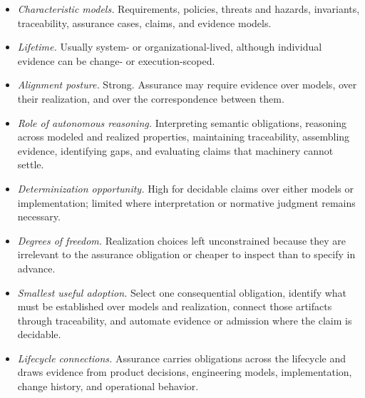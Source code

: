 \begin{itemize}
\tightlist
\item
  \emph{Characteristic models.} Requirements, policies, threats and hazards, invariants, traceability, assurance cases, claims, and evidence models.
\item
  \emph{Lifetime.} Usually system- or organizational-lived, although individual evidence can be change- or execution-scoped.
\item
  \emph{Alignment posture.} Strong. Assurance may require evidence over models, over their realization, and over the correspondence between them.
\item
  \emph{Role of autonomous reasoning.} Interpreting semantic obligations, reasoning across modeled and realized properties, maintaining traceability, assembling evidence, identifying gaps, and evaluating claims that machinery cannot settle.
\item
  \emph{Determinization opportunity.} High for decidable claims over either models or implementation; limited where interpretation or normative judgment remains necessary.
\item
  \emph{Degrees of freedom.} Realization choices left unconstrained because they are irrelevant to the assurance obligation or cheaper to inspect than to specify in advance.
\item
  \emph{Smallest useful adoption.} Select one consequential obligation, identify what must be established over models and realization, connect those artifacts through traceability, and automate evidence or admission where the claim is decidable.
\item
  \emph{Lifecycle connections.} Assurance carries obligations across the lifecycle and draws evidence from product decisions, engineering models, implementation, change history, and operational behavior.
\end{itemize}
